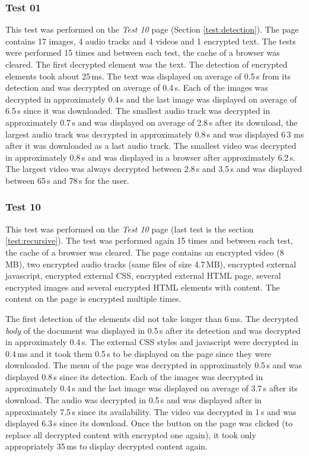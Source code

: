 \subsubsection*{Test 01}
This test was performed on the \textit{Test 10} page (Section \ref{test:detection}). The page contains 17 images, 4 audio tracks and 4 videos and 1 encrypted text. The tests were performed 15 times and between each test, the cache of a browser was cleared. The first decrypted element was the text. The detection of encrypted elements took about 25\,ms. The text was displayed on average of 0.5\,s from its detection and was decrypted on average of 0.4\,s. Each of the images was decrypted in approximately 0.4\,s and the last image was displayed on average of 6.5\,s since it was downloaded. The smallest audio track was decrypted in approximately 0.7\,s and was displayed on average of 2.8\,s after its download, the largest audio track was decrypted in approximately 0.8\,s and was displayed 6\,3 ms after it was downloaded as a last audio track. The smallest video was decrypted in approximately 0.8\,s and was displayed in a browser after approximately 6.2\,s. The largest video was always decrypted between 2.8\,s and 3.5\,s and was displayed between 65\,s and 78\,s for the user.

\subsubsection*{Test 10}
This test was performed on the \textit{Test 10} page (last test is the section \ref{test:recursive}). The test was performed again 15 times and between each test, the cache of a browser was cleared. The page contains an encrypted video (8\,MB), two encrypted audio tracks (same files of size 4.7\,MB), encrypted external javascript, encrypted external CSS, encrypted external HTML page, several encrypted images and several encrypted HTML elements with content. The content on the page is encrypted multiple times.

The first detection of the elements did not take longer than 6\,ms. The decrypted \textit{body} of the document was displayed in 0.5\,s after its detection and was decrypted in approximately 0.4\,s. The external CSS styles and javascript were decrypted in 0.4\,ms and it took them 0.5\,s to be displayed on the page since they were downloaded. The menu of the page was decrypted in approximately 0.5\,s and was displayed 0.8\,s since its detection. Each of the images was decrypted in approximately 0.4\,s and the last image was displayed on average of 3.7\,s after its download. The audio was decrypted in 0.5\,s and was displayed after in approximately 7.5\,s since its availability. The video vas decrypted in 1\,s and was displayed 6.3\,s since its download. Once the button on the page was clicked (to replace all decrypted content with encrypted one again), it took only appropriately 35\,ms to display decrypted content again.

